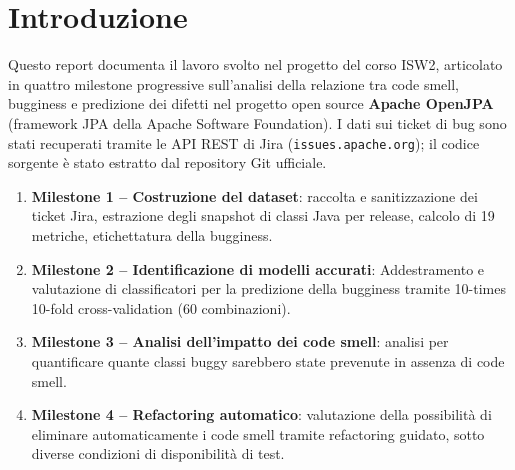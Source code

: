 \section{Introduzione}

Questo report documenta il lavoro svolto nel progetto del corso ISW2, articolato in quattro
milestone progressive sull'analisi della relazione tra code smell, bugginess e predizione
dei difetti nel progetto open source \textbf{Apache OpenJPA} (framework JPA della Apache
Software Foundation). I dati sui ticket di bug sono stati recuperati tramite le API REST
di Jira (\texttt{issues.apache.org}); il codice sorgente è stato estratto dal repository
Git ufficiale.

\begin{enumerate}
    \item \textbf{Milestone 1 -- Costruzione del dataset}: raccolta e sanitizzazione dei
    ticket Jira, estrazione degli snapshot di classi Java per release, calcolo di 19
    metriche, etichettatura della bugginess.

    \item \textbf{Milestone 2 -- Identificazione di modelli accurati}: Addestramento e valutazione
    di classificatori per la predizione della
    bugginess tramite 10-times 10-fold cross-validation (60 combinazioni).

    \item \textbf{Milestone 3 -- Analisi dell'impatto dei code smell}: analisi
    per quantificare quante classi buggy sarebbero state prevenute in assenza di code smell.

    \item \textbf{Milestone 4 -- Refactoring automatico}: valutazione della possibilità
    di eliminare automaticamente i code smell tramite refactoring guidato, sotto diverse
    condizioni di disponibilità di test.
\end{enumerate}
